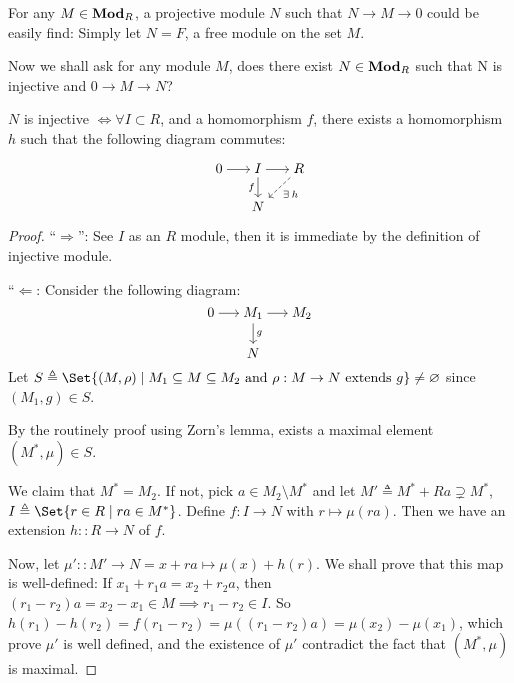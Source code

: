 For any $M \in \mathbf{Mod}_R$, a projective module $N$ such that $N \to M \to 0$
could be easily find: Simply let $N = F$, a free module on the set $M$.

Now we shall ask for any module $M$, does there exist $N \in \mathbf{Mod}_R$ such that
N is injective and $0 \to M \to N$?

\begin{theorem} \label{thm:boers-criterion}
  $N$ is injective $\iff \forall I \subset R$, and a homomorphism
  $f$, there exists a homomorphism $h$
  such that the following diagram commutes:

  \[ \begin{tikzcd}[cramped, sep=15pt]
    0 \ar[r] & I \ar[d, "f"'] \ar[r] & R \ar[dashed, dl, "\exists h"] \\
     & N
    \end{tikzcd}
  \]
  \begin{proof}
    ``$\Rightarrow$'': See $I$ as an $R$ module, then it is immediate by the
    definition of injective module.

    ``$\Leftarrow$: Consider the following diagram:
    \[
      \begin{tikzcd}[cramped, sep=15pt]
      0 \ar[r] & M_1 \ar[d, "g"] \ar[r] & M_2  \\
        & N
      \end{tikzcd}
    \]
    Let $S \triangleq \Set{ (M, \rho) \mid M_1 \subseteq M \subseteq M_2
      \text{ and } \rho : M \to N \text{ extends } g} \neq \varnothing$
    since $(M_1, g) \in S$.

    By the routinely proof using Zorn's lemma, exists a maximal element $(M^*, \mu) \in S$.

    We claim that $M^* = M_2$.
    If not, pick $a \in M_2 \setminus M^*$
    and let $M' \triangleq M^* + Ra \supsetneq M^*$,
    $I \triangleq \Set{ r \in R \mid ra \in M^* }$.
    Define $f : I \to N$ with $r \mapsto \mu(ra)$.
    Then we have an extension $h :: R \to N$ of $f$.

    Now, let $\mu' ::  M' \to N = x + ra \mapsto \mu(x) +
    h(r)$.
    We shall prove that this map is well-defined:
    If $x_1 + r_1a = x_2 + r_2a$, then $(r_1 - r_2) a = x_2 - x_1 \in M \implies
    r_1 - r_2 \in I$.
    So $h(r_1) - h(r_2) = f(r_1 - r_2) = \mu((r_1 - r_2)a) = \mu(x_2) - \mu(x_1)$,
    which prove $\mu'$ is well defined, and the existence of $\mu'$
    contradict the fact that $(M^*, \mu)$ is maximal.
  \end{proof}
\end{theorem}

